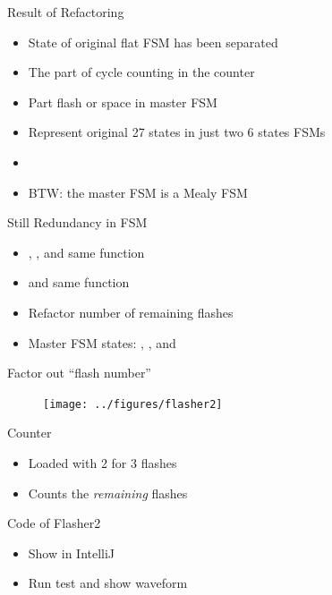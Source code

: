 \begin{frame}[fragile]{Result of Refactoring}
\begin{itemize}
\item State of original flat FSM has been separated
\item The part of cycle counting in the counter
\item Part flash or space in master FSM
\item Represent original 27 states in just two 6 states FSMs
\item 
\item BTW: the master FSM is a Mealy FSM
\end{itemize}
\end{frame}

\begin{frame}[fragile]{Still Redundancy in FSM}
\begin{itemize}
\item {}, , and  same function
\item {} and  same function
\item Refactor number of remaining flashes
\item Master FSM states: , ,
and 
\end{itemize}
\end{frame}

\begin{frame}[fragile]{Factor out ``flash number''}
\begin{figure}
  \texttt{[image: ../figures/flasher2]}
\end{figure}
\end{frame}

\begin{frame}[fragile]{Counter}
\begin{itemize}
\item Loaded with 2 for 3 flashes
\item Counts the \emph{remaining} flashes
\end{itemize}
\end{frame}

\begin{frame}[fragile]{Code of Flasher2}
\begin{itemize}
\item Show in IntelliJ
\item Run test and show waveform
\end{itemize}
\end{frame}



